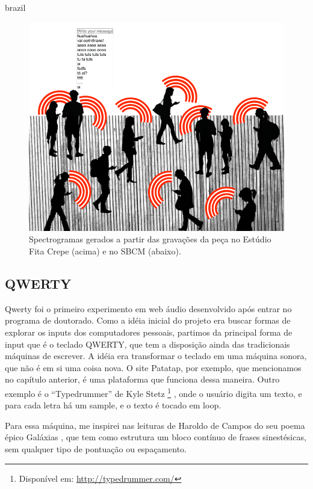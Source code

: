 \begin{otherlanguage*}{brazil}
\begin{figure}[htb]
    \caption{\label{bandasciticasspec}Spectrogramas gerados a partir das gravações da peça no Estúdio Fita Crepe (acima) e no SBCM (abaixo). }
    \begin{center}
    \includegraphics[width=1\linewidth]{pictures/banda_aberta_mob_crowd.png}
    \end{center}
\end{figure}



\subsection{QWERTY}
\label{sec:QWERTY}
Qwerty foi o primeiro experimento em web áudio desenvolvido após entrar no programa de doutorado. Como a idéia inicial do projeto era buscar formas de explorar os inputs dos computadores pessoais, partimos da principal forma de input que é o teclado QWERTY, que tem a disposição ainda das tradicionais máquinas de escrever. A idéia era transformar o teclado em uma máquina sonora, que não é em si uma coisa nova. O site Patatap, por exemplo, que mencionamos no capítulo anterior, é uma plataforma que funciona dessa maneira. Outro exemplo é o ``Typedrummer'' de Kyle Stetz \footnote{Disponível em: \url{http://typedrummer.com/}} , onde o usuário digita um texto, e para cada letra há um sample, e o texto é tocado em loop.


Para essa máquina, me inspirei nas leituras de Haroldo de Campos do seu poema épico Galáxias \cite{Campos2004}, que tem como estrutura um bloco contínuo de frases sinestésicas, sem qualquer tipo de pontuação ou espaçamento. 


\end{otherlanguage*}
